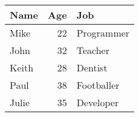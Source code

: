 \begin{tabular}{lrl}
\hline
 Name   &   Age & Job        \\
\hline
 Mike   &    22 & Programmer \\
 John   &    32 & Teacher    \\
 Keith  &    28 & Dentist    \\
 Paul   &    38 & Footballer \\
 Julie  &    35 & Developer  \\
\hline
\end{tabular}